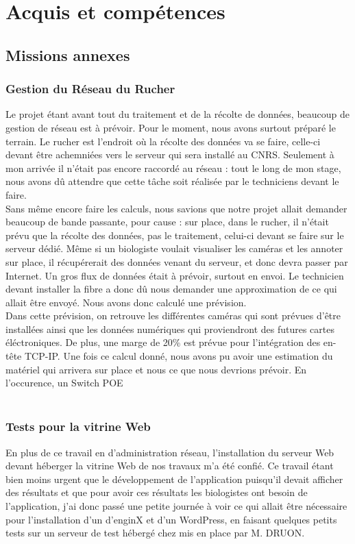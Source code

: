 \documentclass[11pt,french,a4paper]{report}
\begin{document}
\chapter{Acquis et compétences}
    \section{Missions annexes}
        \subsection{Gestion du Réseau du Rucher}
Le projet étant avant tout du traitement et de la récolte de données, beaucoup de gestion de réseau est à prévoir. Pour le moment,
nous avons surtout préparé le terrain. Le rucher est l'endroit où la récolte des données va se faire, celle-ci devant être achemniées vers
le serveur qui sera installé au CNRS. Seulement à mon arrivée il n'était pas encore raccordé au réseau : tout le long de mon stage, 
nous avons dû attendre que cette tâche soit réalisée par le techniciens devant le faire. \\
Sans même encore faire les calculs, nous savions que notre projet allait demander beaucoup de bande passante, pour cause :
sur place, dans le rucher, il n'était prévu que la récolte des données, pas le traitement, celui-ci devant se faire sur le serveur dédié. 
Même si un biologiste voulait visualiser les caméras et les annoter sur place, il récupérerait des données venant du serveur, et donc 
devra passer par Internet. Un gros flux de données était à prévoir, surtout en envoi. Le technicien devant installer la fibre a 
donc dû nous demander une approximation de ce qui allait être envoyé. Nous avons donc calculé une prévision. \\
Dans cette prévision, on retrouve les différentes caméras qui sont prévues d'être installées ainsi que les données numériques qui proviendront des 
futures cartes éléctroniques. De plus, une marge de 20\% est prévue pour l'intégration des en-tête TCP-IP. Une fois ce calcul donné, 
nous avons pu avoir une estimation du matériel qui arrivera sur place et nous ce que nous devrions prévoir. En l'occurence, 
un Switch POE  \\ 

        \subsection{Tests pour la vitrine Web}
En plus de ce travail en d'administration réseau, l'installation du serveur Web devant héberger la vitrine Web de nos travaux m'a été confié. 
Ce travail étant bien moins urgent que le développement de l'application puisqu'il devait afficher des résultats et que pour avoir ces 
résultats les biologistes ont besoin de l'application, j'ai donc passé une petite journée à voir ce qui allait être nécessaire pour l'installation
d'un d'enginX et d'un WordPress, en faisant quelques petits tests sur un serveur de test hébergé chez %
mis en place par M. DRUON. \\
\end{document}
